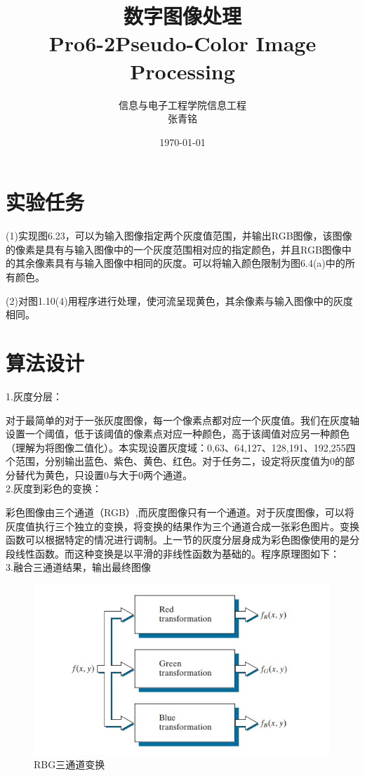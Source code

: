 \documentclass[12pt]{article}
\title{{\Huge{\textbf{数字图像处理}}}\\Pro6-2\quad  Pseudo-Color Image Processing}
\author{信息与电子工程学院\quad 信息工程 \quad 3200105426\\张青铭}
\date{\today}
\begin{document}
\maketitle
\section{实验任务}
(1)实现图6.23，可以为输入图像指定两个灰度值范围，并输出RGB图像，该图像的像素是具有与输入图像中的一个灰度范围相对应的指定颜色，并且RGB图像中的其余像素具有与输入图像中相同的灰度。可以将输入颜色限制为图6.4(a)中的所有颜色。

(2)对图1.10(4)用程序进行处理，使河流呈现黄色，其余像素与输入图像中的灰度相同。
\section{算法设计}
1.灰度分层：

对于最简单的对于一张灰度图像，每一个像素点都对应一个灰度值。我们在灰度轴设置一个阈值，低于该阈值的像素点对应一种颜色，高于该阈值对应另一种颜色（理解为将图像二值化）。本实现设置灰度域：0,63、64,127、128,191、192,255四个范围，分别输出蓝色、紫色、黄色、红色。对于任务二，设定将灰度值为0的部分替代为黄色，只设置0与大于0两个通道。
\\

2.灰度到彩色的变换：

彩色图像由三个通道（RGB）,而灰度图像只有一个通道。对于灰度图像，可以将灰度值执行三个独立的变换，将变换的结果作为三个通道合成一张彩色图片。变换函数可以根据特定的情况进行调制。上一节的灰度分层身成为彩色图像使用的是分段线性函数。而这种变换是以平滑的非线性函数为基础的。程序原理图如下：
\\

3.融合三通道结果，输出最终图像
\begin{figure}[H]
	\centering
	\includegraphics[width=0.5\linewidth]{figures/1}
	\caption{RBG三通道变换}
\end{figure}
\end{document}
